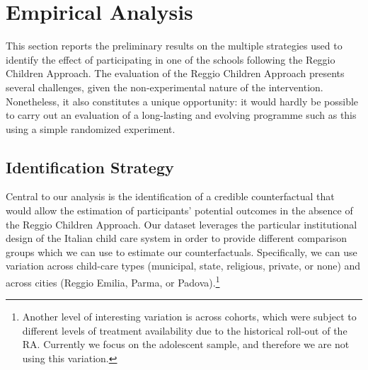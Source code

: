 \documentclass[12pt]{article}
\begin{document}
\section{Empirical Analysis}
\label{sec:analysis}
This section reports the preliminary results on the multiple strategies used to identify the effect of participating in one of the schools following the Reggio Children Approach. The evaluation of the Reggio Children Approach presents several challenges, given the non-experimental nature of the intervention. Nonetheless, it also constitutes a unique opportunity: it would hardly be possible to carry out an evaluation of a long-lasting and evolving programme such as this using a simple randomized experiment. %

\subsection{Identification Strategy}
\label{sec:identification}
Central to our analysis is the identification of a credible counterfactual that would allow the estimation of participants' potential outcomes in the absence of the Reggio Children Approach. Our dataset leverages the particular institutional design of the Italian child care system in order to provide different comparison groups which we can use to estimate our counterfactuals. Specifically, we can use variation across child-care types (municipal, state, religious, private, or none) and across cities (Reggio Emilia, Parma, or Padova).\footnote{Another level of interesting variation is across cohorts, which were subject to different levels of treatment availability due to the historical roll-out of the RA. Currently we focus on the adolescent sample, and therefore we are not using this variation.}
\end{document}

